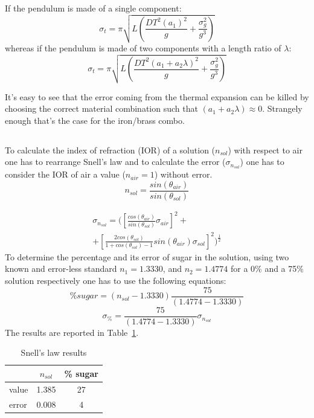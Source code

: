 \documentclass[twocolumn]{article}
\begin{document}
	If the pendulum is made of a single component:
	\begin{equation}
	\sigma_t  = \pi \sqrt{L \left(\frac{DT^{2} \left(a_{1} \right)^{2}}{g} + \frac{\sigma_{g}^{2}}{g^{3}}\right)}
	\end{equation}
	whereas if the pendulum is made of two components with a length ratio of $\lambda$:
	\begin{equation}
	\sigma_t  = \pi \sqrt{L \left(\frac{DT^{2} \left(a_{1} + a_{2} \lambda \right)^{2}}{g} + \frac{\sigma_{g}^{2}}{g^{3}}\right)}
	\end{equation}

	It's easy to see that the error coming from the thermal expansion can be killed by choosing the correct material combination such that $ \left(a_{1} + a_{2} \lambda\right) \approx 0 $. Strangely enough that's the case for the iron/brass combo.
\subsection{} %
\label{sub:snell}
	To calculate the index of refraction (IOR) of a solution ($n_{sol}$) with respect to air one has to rearrange Snell's law and to calculate the error ($\sigma_{n_{sol}}$) one has to consider the IOR of air a value ($n_{air} =1 $) without error.
	\begin{equation}
	n_{sol} = \frac{ sin(\theta_{air})}{sin(\theta_{sol})} 
	\end{equation}

	\begin{multline}
	\sigma_{n_{sol}} = (\left[\frac{cos(\theta_{air})}{sin(\theta_{sol})}  \sigma_{air} \right]^2 + \\
	+ \left[ \frac{2 cos(\theta_{sol})}{1+cos(\theta_{sol})-1}  sin(\theta_{air}) \sigma_{sol}  \right] ^2 )^{\frac{1}{2}}
	\end{multline} 
	To determine the percentage and its error of sugar in the solution, using two known and error-less standard $n_1 = 1.3330$, and $n_2 = 1.4774$ for a  0\% and a 75\% solution respectively one has to use the following equations:
	\begin{equation}
	\% sugar = ( n_{sol} - 1.3330) \frac{75}{ (1.4774- 1.3330)}
	\end{equation}
	\begin{equation}
		\sigma_{\%} = \frac{75}{ (1.4774- 1.3330)} \sigma_{n_{sol}}
	\end{equation}
	The results are reported in Table~\ref{tab:snell}.
	\begin{table}[h!]
		\caption{Snell's law results}
		\label{tab:snell}
		\begin{center}
			\begin{tabular}{l|cc}
			\hline

			\hline
			\textbf{} & \textbf {$n_{sol}$ } & \textbf{ \% sugar} \\
			\hline
				value & 1.385  & 27 \\
				error & 0.008 & 4 \\
			\hline

			\hline
			\end{tabular}
		\end{center}
	\end{table}
\end{document}
